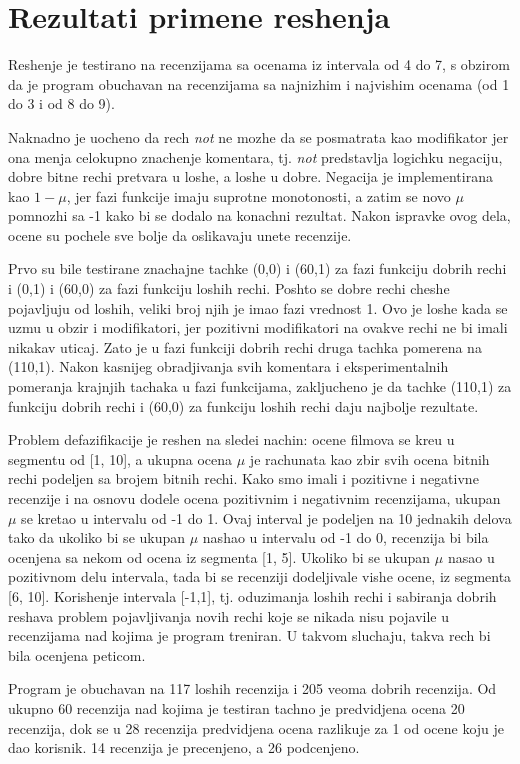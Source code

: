 \documentclass[cyr]{bibl}
\begin{document}
\section{Rezultati primene reshenja}
\begin{justify}
Reshenje je testirano na recenzijama sa ocenama iz intervala od 4 do 7, s obzirom da je program obuchavan na recenzijama sa najnizhim i najvishim ocenama (od 1 do 3 i od 8 do 9).

Naknadno je uocheno da rech \textit{\Lat not} ne mozhe da se posmatrata kao modifikator jer ona menja celokupno znachenje komentara, tj. \textit{\Lat not} predstavlja logichku negaciju, dobre bitne rechi pretvara u loshe, a loshe u dobre. Negacija je implementirana kao \(1 - \mu\), jer fazi funkcije imaju suprotne monotonosti, a zatim se novo \(\mu\) pomnozhi sa -1 kako bi se dodalo na konachni rezultat. Nakon ispravke ovog dela, ocene su pochele sve bolje da oslikavaju unete recenzije.

Prvo su bile testirane znachajne tachke (0,0) i (60,1) za fazi funkciju dobrih rechi i (0,1) i (60,0) za fazi funkciju loshih rechi. Poshto se dobre rechi chesh\cc e pojavljuju od loshih, veliki broj njih je imao fazi vrednost 1. Ovo je loshe kada se uzmu u obzir i modifikatori, jer pozitivni modifikatori na ovakve rechi ne bi imali nikakav uticaj. Zato je u fazi funkciji dobrih rechi druga tachka pomerena na (110,1). Nakon kasnijeg obradjivanja svih komentara i eksperimentalnih pomeranja krajnjih tachaka u fazi funkcijama, zakljucheno je da tachke (110,1) za funkciju dobrih rechi i (60,0) za funkciju loshih rechi daju najbolje rezultate.  

Problem defazifikacije je reshen na slede\cc i nachin: ocene filmova se kre\cc u u segmentu od [1, 10], a ukupna ocena \(\mu\) je rachunata kao zbir svih ocena bitnih rechi podeljen sa brojem bitnih rechi. Kako smo imali i pozitivne i negativne recenzije i na osnovu dodele ocena pozitivnim i negativnim recenzijama, ukupan \(\mu\) se kretao u intervalu od -1 do 1.
Ovaj interval je podeljen na 10 jednakih delova tako da ukoliko bi se ukupan \(\mu\) nashao u intervalu od -1 do 0, recenzija bi bila ocenjena sa nekom od ocena iz segmenta [1, 5]. Ukoliko bi se ukupan \(\mu\) nasao u pozitivnom delu intervala, tada bi se recenziji dodeljivale vishe ocene, iz segmenta [6, 10]. Korish\cc enje intervala [-1,1], tj. oduzimanja loshih rechi i sabiranja dobrih reshava problem pojavljivanja novih rechi koje se nikada nisu pojavile u recenzijama nad kojima je program treniran. U takvom sluchaju, takva rech bi bila ocenjena peticom.

Program je obuchavan na 117 loshih recenzija i 205 veoma dobrih recenzija. Od ukupno 60 recenzija nad kojima je testiran tachno je predvidjena ocena 20 recenzija, dok se u 28 recenzija predvidjena ocena razlikuje za 1 od ocene koju je dao korisnik. 14 recenzija je precenjeno, a 26 podcenjeno.
\end{justify}
\end{document}

